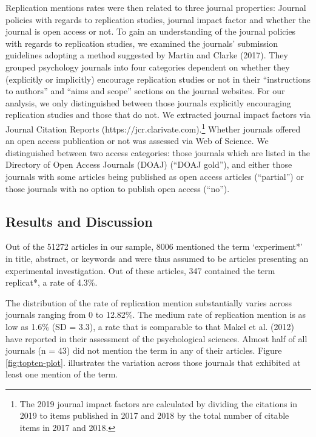 \documentclass[]{elsarticle} %
\begin{document}
Replication mentions rates were then related to three journal properties: Journal policies with regards to replication studies, journal impact factor and whether the journal is open access or not.
To gain an understanding of the journal policies with regards to replication studies, we examined the journals' submission guidelines adopting a method suggested by Martin and Clarke (2017).
They grouped psychology journals into four categories dependent on whether they (explicitly or implicitly) encourage replication studies or not in their ``instructions to authors'' and ``aims and scope'' sections on the journal websites. For our analysis, we only distinguished between those journals explicitly encouraging replication studies and those that do not.
We extracted journal impact factors via Journal Citation Reports (https://jcr.clarivate.com).\footnote{The 2019 journal impact factors are calculated by dividing the citations in 2019 to items published in 2017 and 2018 by the total number of citable items in 2017 and 2018.}
Whether journals offered an open access publication or not was assessed via Web of Science.
We distinguished between two access categories: those journals which are listed in the Directory of Open Access Journals (DOAJ) (``DOAJ gold''), and either those journals with some articles being published as open access articles (``partial'') or those journals with no option to publish open access (``no'').

\hypertarget{results-and-discussion}{%
\subsection{Results and Discussion}\label{results-and-discussion}}

Out of the 51272 articles in our sample, 8006 mentioned the term `experiment*' in title, abstract, or keywords and were thus assumed to be articles presenting an experimental investigation.
Out of these articles, 347 contained the term replicat*, a rate of 4.3\%.

The distribution of the rate of replication mention substantially varies across journals ranging from 0 to 12.82\%. The medium rate of replication mention is as low as 1.6\% (SD = 3.3), a rate that is comparable to that Makel et al. (2012) have reported in their assessment of the psychological sciences.
Almost half of all journals (n = 43) did not mention the term in any of their articles.
Figure \ref{fig:topten-plot}. illustrates the variation across those journals that exhibited at least one mention of the term.
\end{document}
